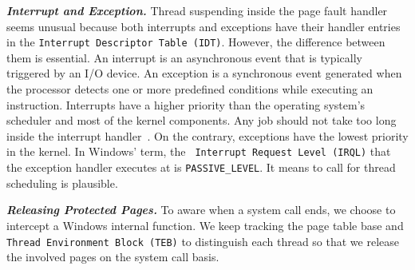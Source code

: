 


\textbf{\textit{Interrupt and Exception.}} Thread suspending inside the page fault handler seems unusual because both interrupts and exceptions have their handler entries in the \texttt{Interrupt Descriptor Table (IDT)}. However, the difference between them is essential.  An interrupt is an asynchronous event that is typically triggered by an I/O device. An exception is a synchronous event generated when the processor detects one or more predefined conditions while executing an instruction. Interrupts have a higher priority than the operating system's scheduler and most of the kernel components. Any job should not take too long inside the interrupt handler~\cite{msdnwatchdog}.  On the contrary, exceptions have the lowest priority in the kernel. In Windows' term, the \texttt{ Interrupt Request Level (IRQL)} that the exception handler executes at is \texttt{PASSIVE\_LEVEL}. It means to call for thread scheduling is plausible.






\textbf{\textit{Releasing Protected Pages.}} To aware when a system call ends, we choose to intercept a Windows internal function. We keep tracking the page table base and \texttt{Thread Environment Block (TEB)} to distinguish each thread so that we release the involved pages on the system call basis.  


